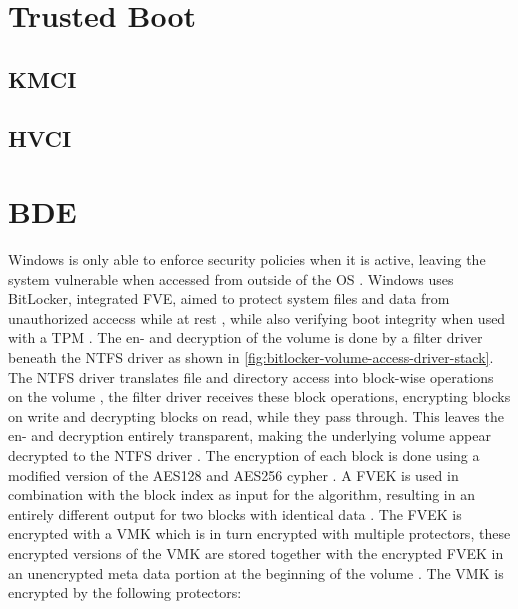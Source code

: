 \section{Trusted Boot}
\subsection{KMCI}
\subsection{HVCI}

\section{\acf{BDE}}
\label{sec:bde}
Windows is only able to enforce security policies when it is active, leaving the system vulnerable when accessed from outside of the \ac{OS} \cite[9. BitLocker Drive encryption]{windows-internals-6-part2}.
Windows uses BitLocker, integrated \ac{FVE}, aimed to protect system files and data from unauthorized accecss while at rest \cite{microsoft-bitlocker-overview}, while also verifying boot integrity when used with a \ac{TPM} \cite[9. BitLocker Drive encryption]{windows-internals-6-part2}.
The en- and decryption of the volume is done by a filter driver beneath the \ac{NTFS} driver as shown in \autoref{fig:bitlocker-volume-access-driver-stack}.
The \ac{NTFS} driver translates file and directory access into block-wise operations on the volume , the filter driver receives these block operations, encrypting blocks on write and decrypting blocks on read, while they pass through.
This leaves the en- and decryption entirely transparent, making the underlying volume appear decrypted to the \ac{NTFS} driver \cite[9. Full-Volume Encryption Driver]{windows-internals-6-part2}.
The encryption of each block is done using a modified version of the \ac{AES}128 and \ac{AES}256 cypher \cite[9. Encryption Keys]{windows-internals-6-part2}.
A \ac{FVEK} is used in combination with the block index as input for the algorithm, resulting in an entirely different output for two blocks with identical data \cite[9. Full-Volume Encryption Driver]{windows-internals-6-part2}.
The \ac{FVEK} is encrypted with a \ac{VMK} which is in turn encrypted with multiple protectors, these encrypted versions of the \ac{VMK} are stored together with the encrypted \ac{FVEK} in an unencrypted meta data portion at the beginning of the volume \cite[9. Encryption Keys]{windows-internals-6-part2}.
The \ac{VMK} is encrypted by the following protectors:

